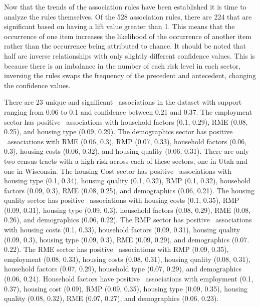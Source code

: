 \clearpage


Now that the trends of the association rules have been established it is time to analyze the rules themselves. Of the 528 association rules, there are 224 that are significant based on having a lift value greater than 1. This means that the occurrence of one item increases the likelihood of the occurrence of another item rather than the occurrence being attributed to chance. It should be noted that half are inverse relationships with only slightly different confidence values. This is because there is an imbalance in the number of each risk level in each sector, inversing the rules swaps the frequency of the precedent and antecedent, changing the confidence values. 

There are 23 unique and significant \hhr~associations in the dataset with support ranging from 0.06 to 0.1 and confidence between 0.21 and 0.37. The employment sector has positive \hhr~associations with household factors (0.1, 0.29), RME (0.08, 0.25), and housing type (0.09, 0.29). The demographics sector has positive \hhr~associations with RME (0.06, 0.3), RMP (0.07, 0.33), household factors (0.06, 0.3), housing costs (0.06, 0.32), and housing quality (0.06, 0.31). There are only two census tracts with a high risk across each of these sectors, one in Utah and one in Wisconsin. The housing Cost sector has positive \hhr~associations with housing type (0.1, 0.34), housing quality (0.1, 0.32), RMP (0.1, 0.32), household factors (0.09, 0.3), RME (0.08, 0.25), and demographics (0.06, 0.21). The housing quality sector has positive \hhr~associations with housing costs (0.1, 0.35), RMP (0.09, 0.31), housing type (0.09, 0.3), household factors (0.08, 0.29), RME (0.08, 0.26), and demographics (0.06, 0.22). The RMP  sector has positive \hhr~associations with housing costs (0.1, 0.33), household factors (0.09, 0.31), housing quality (0.09, 0.3), housing type (0.09, 0.3), RME (0.09, 0.29), and demographics (0.07. 0.22). The RME sector has positive \hhr~associations with RMP (0.09, 0.35), employment (0.08, 0.33), housing costs (0.08, 0.31), housing quality (0.08, 0.31), household factors (0.07, 0.29), household type (0.07, 0.29), and demographics (0.06, 0.24). Household factors have positive \hhr~associations with employment (0.1, 0.37), housing cost (0.09), RMP (0.09, 0.35), housing type (0.09, 0.35), housing quality (0.08, 0.32), RME (0.07, 0.27), and demographics (0.06, 0.23). 

